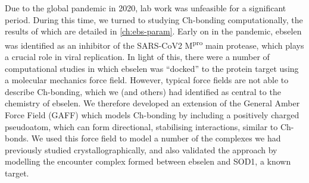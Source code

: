 \begin{refsection}
Due to the global pandemic in 2020, lab work was unfeasible for a significant period.
During this time, we turned to studying Ch-bonding computationally, the results of which are detailed in \cref{ch:ebs-param}.
Early on in the pandemic, ebselen was identified as an inhibitor of the SARS-CoV2 M\textsuperscript{pro} main protease, which plays a crucial role in viral replication.\autocite{Jin2020}
In light of this, there were a number of computational studies in which ebselen was ``docked'' to the protein target using a molecular mechanics force field.
However, typical force fields are not able to describe Ch-bonding, which we (and others) had identified as central to the chemistry of ebselen.
We therefore developed an extension of the General Amber Force Field (GAFF) which models Ch-bonding by including a positively charged pseudoatom, which can form directional, stabilising interactions, similar to Ch-bonds.
We used this force field to model a number of the complexes we had previously studied crystallographically, and also validated the approach by modelling the encounter complex formed between ebselen and SOD1, a known target.

\printbibliography[heading=subbibliography]
\end{refsection}
